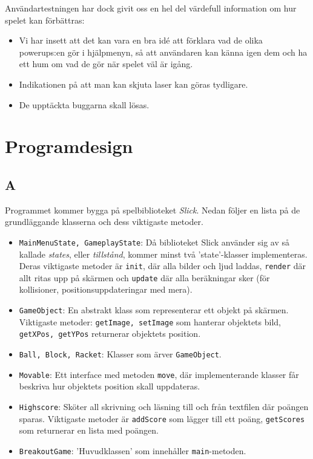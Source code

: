 \documentclass[11pt,a4paper]{article}
\begin{document}
Användartestningen har dock givit oss en hel del värdefull information om hur spelet kan förbättras:

\begin{itemize}
	\item Vi har insett att det kan vara en bra idé att förklara vad de olika powerups:en gör i hjälpmenyn, så att användaren kan känna igen dem och ha ett hum om vad de gör när spelet väl är igång.
	\item Indikationen på att man kan skjuta laser kan göras tydligare.
	\item De upptäckta buggarna skall lösas.
\end{itemize}

\section{Programdesign}

\subsection{A}
Programmet kommer bygga på spelbiblioteket \emph{Slick}. Nedan följer en lista på de grundläggande klasserna och dess viktigaste metoder.

\begin{itemize}
	\item \texttt{MainMenuState, GameplayState}: Då biblioteket Slick använder sig av så kallade \emph{states}, eller \emph{tillstånd}, kommer minst två 'state'-klasser implementeras. Deras viktigaste metoder är \texttt{init}, där alla bilder och ljud laddas, \texttt{render} där allt ritas upp på skärmen och \texttt{update} där alla beräkningar sker (för kollisioner, positionsuppdateringar med mera).
	\item \texttt{GameObject}: En abstrakt klass som representerar ett objekt på skärmen. Viktigaste metoder: \texttt{getImage, setImage} som hanterar objektets bild, \texttt{getXPos, getYPos} returnerar objektets position.
	\item \texttt{Ball, Block, Racket}: Klasser som ärver \texttt{GameObject}.
	\item \texttt{Movable}: Ett interface med metoden \texttt{move}, där implementerande klasser får beskriva hur objektets position skall uppdateras.
	\item \texttt{Highscore}: Sköter all skrivning och läsning till och från textfilen där poängen sparas. Viktigaste metoder är \texttt{addScore} som lägger till ett poäng, \texttt{getScores} som returnerar en lista med poängen.
	\item \texttt{BreakoutGame}: 'Huvudklassen' som innehåller \texttt{main}-metoden.
\end{itemize}
\end{document}
